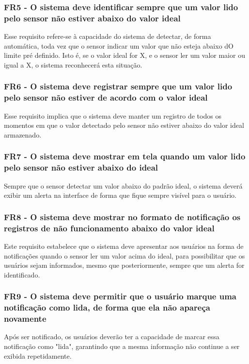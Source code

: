 \subsubsection{FR5 - O sistema deve identificar sempre que um valor lido pelo sensor não estiver abaixo do valor ideal}
Esse requisito refere-se à capacidade do sistema de detectar, de forma automática, toda vez que o sensor indicar um valor que não esteja abaixo dO limite pré definido. Isto é, se o valor ideal for X, e o sensor ler um valor maior ou igual a X, o sistema reconhecerá esta situação.

\subsubsection{FR6 - O sistema deve registrar sempre que um valor lido pelo sensor não estiver de acordo com o valor ideal}
Esse requisito implica que o sistema deve manter um registro de todos os momentos em que o valor detectado pelo sensor não estiver abaixo do valor ideal armazenado.

\subsubsection{FR7 - O sistema deve mostrar em tela quando um valor lido pelo sensor não estiver abaixo do ideal}
Sempre que o sensor detectar um valor abaixo do padrão ideal, o sistema deverá exibir um alerta na interface de forma que fique sempre visível para o usuário.

\subsubsection{FR8 - O sistema deve mostrar no formato de notificação os registros de não funcionamento abaixo do valor ideal}
Este requisito estabelece que o sistema deve apresentar aos usuários na forma de notificações quando o sensor ler um valor acima do ideal, para possibilitar que os usuários sejam informados, mesmo que posteriormente, sempre que um alerta for identificado.

\subsubsection{FR9 - O sistema deve permitir que o usuário marque uma notificação como lida, de forma que ela não apareça novamente}
Após ser notificado, os usuários deverão ter a capacidade de marcar essa notificação como "lida", garantindo que a mesma informação não continue a ser exibida repetidamente.

